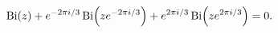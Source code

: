 \[\mathop{\mathrm{Bi}\/}\nolimits\!\left(z\right)+e^{-2\pi i/3}\mathop{\mathrm{%
Bi}\/}\nolimits\!\left(ze^{-2\pi i/3}\right)+e^{2\pi i/3}\mathop{\mathrm{Bi}\/%
}\nolimits\!\left(ze^{2\pi i/3}\right)=0.\]